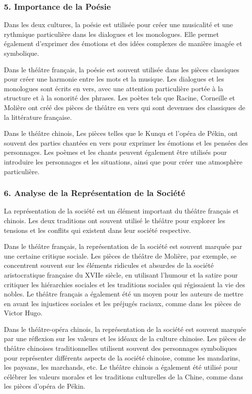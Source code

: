 \documentclass[UTF8,a4paper,12pt]{ctexart}
\numberwithin{equation}{section}
\begin{document}
\subsubsection*{5. Importance de la Poésie}
Dans les deux cultures, la poésie est utilisée pour créer une musicalité et une rythmique particulière dans les dialogues et les monologues. Elle permet également d'exprimer des émotions et des idées complexes de manière imagée et symbolique.

Dans le théâtre français, la poésie est souvent utilisée dans les pièces classiques pour créer une harmonie entre les mots et la musique. Les dialogues et les monologues sont écrits en vers, avec une attention particulière portée à la structure et à la sonorité des phrases. Les poètes tels que Racine, Corneille et Molière ont créé des pièces de théâtre en vers qui sont devenues des classiques de la littérature française.

Dans le théâtre chinois, Les pièces telles que le Kunqu et l'opéra de Pékin, ont souvent des parties chantées en vers pour exprimer les émotions et les pensées des personnages. Les poèmes et les chants peuvent également être utilisés pour introduire les personnages et les situations, ainsi que pour créer une atmosphère particulière.

\subsubsection*{6. Analyse de la Représentation de la Société }
La représentation de la société est un élément important du théâtre français et chinois. Les deux traditions ont souvent utilisé le théâtre pour explorer les tensions et les conflits qui existent dans leur société respective.

Dans le théâtre français, la représentation de la société est souvent marquée par une certaine critique sociale. Les pièces de théâtre de Molière, par exemple, se concentrent souvent sur les éléments ridicules et absurdes de la société aristocratique française du XVIIe siècle, en utilisant l'humour et la satire pour critiquer les hiérarchies sociales et les traditions sociales qui régissaient la vie des nobles. Le théâtre français a également été un moyen pour les auteurs de mettre en avant les injustices sociales et les préjugés raciaux, comme dans les pièces de Victor Hugo.

Dans le théâtre-opéra chinois, la représentation de la société est souvent marquée par une réflexion sur les valeurs et les idéaux de la culture chinoise. Les pièces de théâtre chinoises traditionnelles utilisent souvent des personnages symboliques pour représenter différents aspects de la société chinoise, comme les mandarins, les paysans, les marchands, etc. Le théâtre chinois a également été utilisé pour célébrer les valeurs morales et les traditions culturelles de la Chine, comme dans les pièces d'opéra de Pékin.
\end{document}
